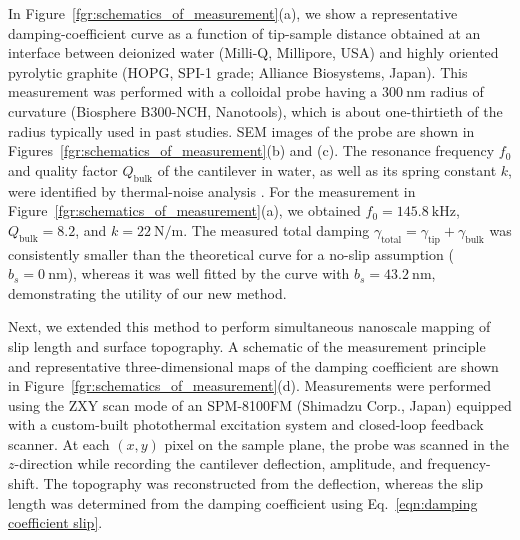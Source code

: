 \documentclass[journal=jacsat,manuscript=article]{achemso}
\begin{document}
In Figure~\ref{fgr:schematics_of_measurement}(a), we show a representative damping-coefficient curve as a function of tip-sample distance obtained at an interface between deionized water (Milli-Q, Millipore, USA) and highly oriented pyrolytic graphite (HOPG, SPI-1 grade; Alliance Biosystems, Japan). This measurement was performed with a colloidal probe having a \(\SI{300}{\nano\metre}\) radius of curvature (Biosphere B300-NCH, Nanotools), which is about one-thirtieth of the radius typically used in past studies. SEM images of the probe are shown in Figures~\ref{fgr:schematics_of_measurement}(b) and (c). The resonance frequency \(f_0\) and quality factor \(Q_{\text{bulk}}\) of the cantilever in water, as well as its spring constant \(k\), were identified by thermal-noise analysis \cite{Butt1995-nx, Pottier2017-ch}. For the measurement in Figure~\ref{fgr:schematics_of_measurement}(a), we obtained \(f_0 = \SI{145.8}{\kilo\hertz}\), \(Q_{\text{bulk}} = 8.2\), and \(k = \SI{22}{\newton\per\metre}\). The measured total damping \(\gamma_{\text{total}}=\gamma_{\text{tip}}+\gamma_{\text{bulk}}\) was consistently smaller than the theoretical curve for a no-slip assumption (\(b_s = \SI{0}{\nano\metre}\)), whereas it was well fitted by the curve with \(b_s = \SI{43.2}{\nano\metre}\), demonstrating the utility of our new method.

Next, we extended this method to perform simultaneous nanoscale mapping of slip length and surface topography. A schematic of the measurement principle and representative three-dimensional maps of the damping coefficient are shown in Figure~\ref{fgr:schematics_of_measurement}(d). Measurements were performed using the ZXY scan mode of an SPM-8100FM (Shimadzu Corp., Japan) equipped with a custom-built photothermal excitation system and closed-loop feedback scanner. At each \((x, y)\) pixel on the sample plane, the probe was scanned in the \(z\)-direction while recording the cantilever deflection, amplitude, and frequency-shift. The topography was reconstructed from the deflection, whereas the slip length was determined from the damping coefficient using Eq.~\ref{eqn:damping coefficient slip}. 
\end{document}
